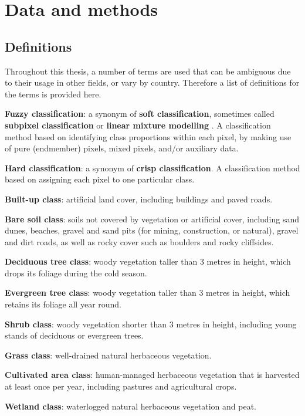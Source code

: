 \documentclass[a4paper,10pt]{book}
\begin{document}
\chapter{Data and methods}

\section{Definitions}

Throughout this thesis, a number of terms are used that can be ambiguous due to their usage in other fields, or vary by country. Therefore a list of definitions for the terms is provided here.

\textbf{Fuzzy classification}: a synonym of \textbf{soft classification}, sometimes called \textbf{subpixel classification} or \textbf{linear mixture modelling} \citep{Okeke2006fuzzyexponent}. A classification method based on identifying class proportions within each pixel, by making use of pure (endmember) pixels, mixed pixels, and/or auxiliary data.

\textbf{Hard classification}: a synonym of \textbf{crisp classification}. A classification method based on assigning each pixel to one particular class.

\textbf{Built-up class}: artificial land cover, including buildings and paved roads.

\textbf{Bare soil class}: soils not covered by vegetation or artificial cover, including sand dunes, beaches, gravel and sand pits (for mining, construction, or natural), gravel and dirt roads, as well as rocky cover such as boulders and rocky cliffsides.

\textbf{Deciduous tree class}: woody vegetation taller than 3 metres in height, which drops its foliage during the cold season.

\textbf{Evergreen tree class}: woody vegetation taller than 3 metres in height, which retains its foliage all year round.

\textbf{Shrub class}: woody vegetation shorter than 3 metres in height, including young stands of deciduous or evergreen trees.

\textbf{Grass class}: well-drained natural herbaceous vegetation.

\textbf{Cultivated area class}: human-managed herbaceous vegetation that is harvested at least once per year, including pastures and agricultural crops.

\textbf{Wetland class}: waterlogged natural herbaceous vegetation and peat.
\end{document}
